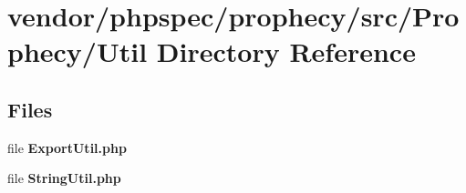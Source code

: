 \section{vendor/phpspec/prophecy/src/\+Prophecy/\+Util Directory Reference}
\label{dir_cc306dc77c4fa2c9e81294cab5999873}
\subsection*{Files}
\begin{DoxyCompactItemize}
\item 
file {\bf Export\+Util.\+php}
\item 
file {\bf String\+Util.\+php}
\end{DoxyCompactItemize}
